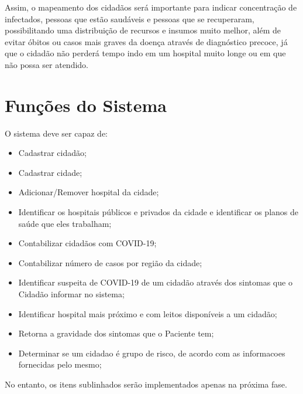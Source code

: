 \documentclass[10pt]{article}
\begin{document}
\hspace{2em} Assim, o mapeamento dos cidadãos será importante para indicar concentração de infectados, pessoas que estão saudáveis e pessoas que se recuperaram, possibilitando uma distribuição de recursos e insumos muito melhor, além de evitar óbitos ou casos mais graves da doença através de diagnóstico precoce, já que o cidadão não perderá tempo indo em um hospital muito longe ou em que não possa ser atendido.

\section{Funções do Sistema}
O sistema deve ser capaz de:
\begin{itemize}
\item Cadastrar cidadão;
\item Cadastrar cidade;
\item Adicionar/Remover hospital da cidade;
\item Identificar os hospitais públicos e privados da cidade e identificar os planos de saúde que eles trabalham;
\item Contabilizar cidadãos com COVID-19;
\item Contabilizar número de casos por região da cidade;
\item Identificar suspeita de COVID-19 de um cidadão através dos sintomas que o Cidadão informar no sistema;
\item Identificar hospital mais próximo e com leitos disponíveis a um cidadão;
\item Retorna a gravidade dos sintomas que o Paciente tem;
\item Determinar se um cidadao é grupo de risco, de acordo com as informacoes fornecidas pelo mesmo;
\end{itemize}	



No entanto, os itens sublinhados serão implementados apenas na próxima fase.
\end{document}
